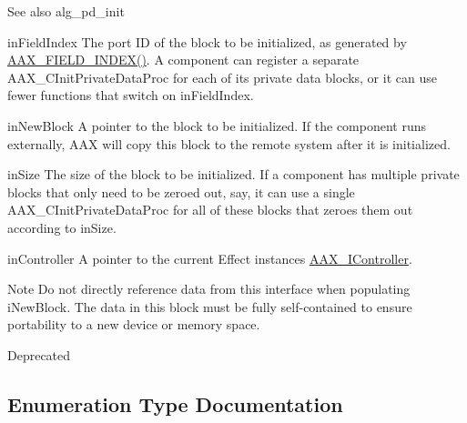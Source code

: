 \begin{DoxySeeAlso}{See also}
alg\+\_\+pd\+\_\+init
\end{DoxySeeAlso}
\begin{DoxyParagraph}{in\+Field\+Index}
The port I\+D of the block to be initialized, as generated by \hyperlink{a00149_acf807247ecd6e5899dc9dc31644e9a1d}{A\+A\+X\+\_\+\+F\+I\+E\+L\+D\+\_\+\+I\+N\+D\+E\+X()}. A component can register a separate A\+A\+X\+\_\+\+C\+Init\+Private\+Data\+Proc for each of its private data blocks, or it can use fewer functions that switch on {\ttfamily in\+Field\+Index}.
\end{DoxyParagraph}
\begin{DoxyParagraph}{in\+New\+Block}
A pointer to the block to be initialized. If the component runs externally, A\+A\+X will copy this block to the remote system after it is initialized.
\end{DoxyParagraph}
\begin{DoxyParagraph}{in\+Size}
The size of the block to be initialized. If a component has multiple private blocks that only need to be zeroed out, say, it can use a single A\+A\+X\+\_\+\+C\+Init\+Private\+Data\+Proc for all of these blocks that zeroes them out according to {\ttfamily in\+Size}.
\end{DoxyParagraph}
\begin{DoxyParagraph}{in\+Controller}
A pointer to the current Effect instance\textquotesingle{}s \hyperlink{a00090}{A\+A\+X\+\_\+\+I\+Controller}. 
\end{DoxyParagraph}
\begin{DoxyNote}{Note}
Do not directly reference data from this interface when populating {\ttfamily i\+New\+Block}. The data in this block must be fully self-\/contained to ensure portability to a new device or memory space.
\end{DoxyNote}
\begin{DoxyRefDesc}{Deprecated}
\item[\hyperlink{a00386__deprecated000004}{Deprecated}]\end{DoxyRefDesc}


\subsection{Enumeration Type Documentation}
\hypertarget{a00163_af0682195d377392ad356fd2b00c36892}{}
